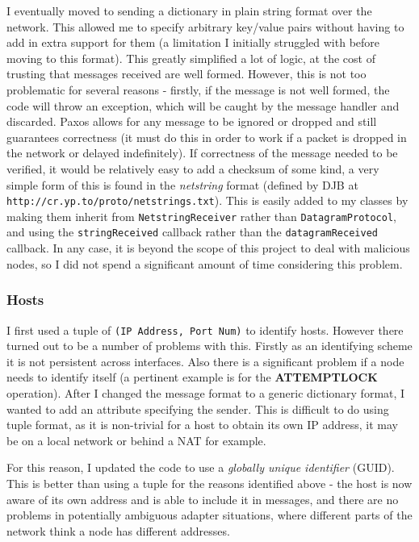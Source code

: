 \documentclass[12pt,twoside,notitlepage]{report}
\newcommand{\op}[1]  {{\bf #1}}         %
\begin{document}
I eventually moved to sending a dictionary in plain string format over the network. This allowed
me to specify arbitrary key/value pairs without having to add in extra support for them (a
limitation I initially struggled with before moving to this format). This greatly simplified a lot
of logic, at the cost of trusting that messages received are well formed.  However, this is not
too problematic for several reasons - firstly, if the message is not well formed, the code will
throw an exception, which will be caught by the message handler and discarded. Paxos allows for
any message to be ignored or dropped and still guarantees correctness (it must do this in order to
work if a packet is dropped in the network or delayed indefinitely). If correctness of the message
needed to be verified, it would be relatively easy to add a checksum of some kind, a very simple
form of this is found in the \emph{netstring} format (defined by DJB at
\verb+http://cr.yp.to/proto/netstrings.txt+). This is easily added to my classes by making them
inherit from \verb+NetstringReceiver+ rather than \verb+DatagramProtocol+, and using
the \verb+stringReceived+ callback rather than the \verb+datagramReceived+ callback. In any case,
it is beyond the scope of this project to deal with malicious nodes, so I did not spend a
significant amount of time considering this problem.

\subsubsection*{Hosts}

I first used a tuple of \verb+(IP Address, Port Num)+ to identify hosts. However there turned out
to be a number of problems with this. Firstly as an identifying scheme it is not persistent across
interfaces. Also there is a significant problem if a node needs to identify itself (a pertinent
example is for the \op{ATTEMPTLOCK} operation). After I changed the message format to a generic
dictionary format, I wanted to add an attribute specifying the sender. This is difficult to do
using tuple format, as it is non-trivial for a host to obtain its own IP address, it may be on a
local network or behind a NAT for example.

For this reason, I updated the code to use a \emph{globally unique identifier} (GUID). This is
better than using a tuple for the reasons identified above - the host is now aware of its own
address and is able to include it in messages, and there are no problems in potentially ambiguous
adapter situations, where different parts of the network think a node has different addresses.
\end{document}
